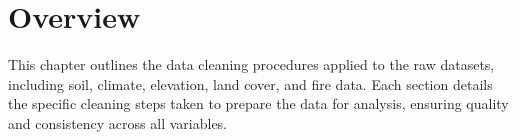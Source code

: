 \section{Overview}

This chapter outlines the data cleaning procedures applied to the raw datasets, including soil, climate, elevation, land cover, and fire data. Each section details the specific cleaning steps taken to prepare the data for analysis, ensuring quality and consistency across all variables.





